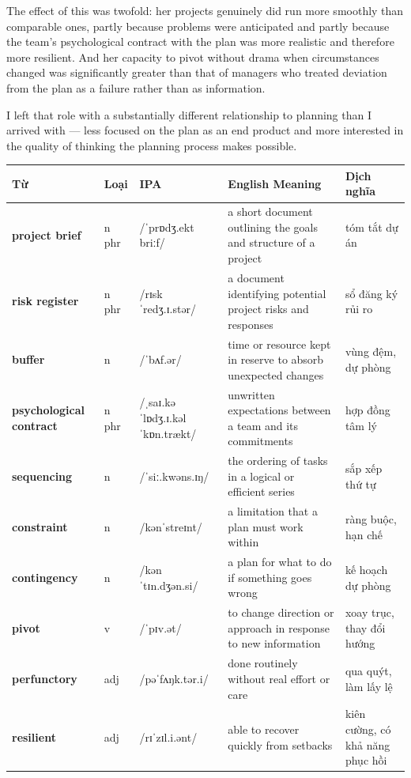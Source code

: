 \begin{ieltsanswer}
The effect of this was twofold: her projects genuinely did run more smoothly than comparable ones, partly because problems were anticipated and partly because the team's psychological contract with the plan was more realistic and therefore more resilient. And her capacity to pivot without drama when circumstances changed was significantly greater than that of managers who treated deviation from the plan as a failure rather than as information.

I left that role with a substantially different relationship to planning than I arrived with — less focused on the plan as an end product and more interested in the quality of thinking the planning process makes possible.
\end{ieltsanswer}


\vspace{0.8em}
\begin{center}
\renewcommand{\arraystretch}{1.65}
\begin{tabularx}{\textwidth}{|V{0.22\textwidth}|C{0.07\textwidth}|I{0.20\textwidth}|Y|V{0.18\textwidth}|}
\hline
{}
\textbf{Từ} & \textbf{Loại} & \textbf{IPA} & \textbf{English Meaning} & \textbf{Dịch nghĩa} \\
\hline
\textbf{project brief} & n phr & /ˈprɒdʒ.ekt briːf/ & a short document outlining the goals and structure of a project & tóm tắt dự án \\ \hline
\textbf{risk register} & n phr & /rɪsk ˈredʒ.ɪ.stər/ & a document identifying potential project risks and responses & sổ đăng ký rủi ro \\ \hline
\textbf{buffer} & n & /ˈbʌf.ər/ & time or resource kept in reserve to absorb unexpected changes & vùng đệm, dự phòng \\ \hline
\textbf{psychological contract} & n phr & /ˌsaɪ.kəˈlɒdʒ.ɪ.kəl ˈkɒn.trækt/ & unwritten expectations between a team and its commitments & hợp đồng tâm lý \\ \hline
\textbf{sequencing} & n & /ˈsiː.kwəns.ɪŋ/ & the ordering of tasks in a logical or efficient series & sắp xếp thứ tự \\ \hline
\textbf{constraint} & n & /kənˈstreɪnt/ & a limitation that a plan must work within & ràng buộc, hạn chế \\ \hline
\textbf{contingency} & n & /kənˈtɪn.dʒən.si/ & a plan for what to do if something goes wrong & kế hoạch dự phòng \\ \hline
\textbf{pivot} & v & /ˈpɪv.ət/ & to change direction or approach in response to new information & xoay trục, thay đổi hướng \\ \hline
\textbf{perfunctory} & adj & /pəˈfʌŋk.tər.i/ & done routinely without real effort or care & qua quýt, làm lấy lệ \\ \hline
\textbf{resilient} & adj & /rɪˈzɪl.i.ənt/ & able to recover quickly from setbacks & kiên cường, có khả năng phục hồi \\ \hline
\end{tabularx}
\end{center}

